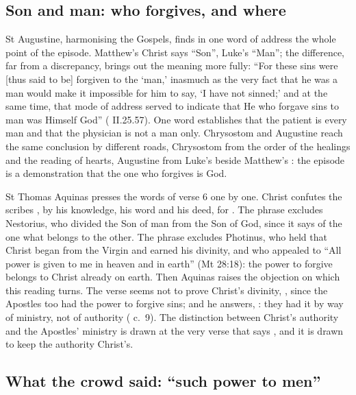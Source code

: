 \subsection{Son and man: who forgives, and where}

St Augustine, harmonising the Gospels, finds in one word of address the whole
point of the episode. Matthew's Christ says ``Son'', Luke's ``Man''; the
difference, far from a discrepancy, brings out the meaning more fully: ``For
these sins were [thus said to be] forgiven to the `man,' inasmuch as the very
fact that he was a man would make it impossible for him to say, `I have not
sinned;' and at the same time, that mode of address served to indicate that He
who forgave sins to man was Himself God'' (
II.25.57). One word establishes that the patient is every man and that the
physician is not a man only. Chrysostom and Augustine reach the same conclusion
by different roads, Chrysostom from the order of the healings and the reading
of hearts, Augustine from Luke's  beside Matthew's :
the episode is a demonstration
that the one who forgives is God.

St Thomas Aquinas presses the words of verse 6 one by one. Christ confutes the
scribes , by his knowledge, his word and
his deed, for . The phrase  excludes Nestorius, who
divided the Son of man from the Son of God, since it says of the one what
belongs to the other. The phrase  excludes Photinus, who held
that Christ began from the Virgin and earned his divinity, and who appealed to
``All power is given to me in heaven and in earth'' (Mt 28:18): the power to
forgive belongs to Christ already on earth. Then Aquinas raises the objection
on which this reading turns. The verse seems not to prove Christ's divinity,
, since the Apostles too
had the power to forgive sins; and he answers, : they had it by way of
ministry, not of authority ( c.~9). The distinction
between Christ's authority and the Apostles' ministry is drawn at the very
verse that says , and it is drawn to keep the authority
Christ's.

\subsection{What the crowd said: ``such power to men''}


